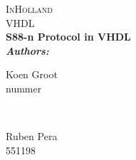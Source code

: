 \documentclass[12pt]{report}
\begin{document}
	\begin{titlepage}
		
		\pagecolor{landanimal}\afterpage{\nopagecolor}
		\center	
		
		\color{white}
		\textsc{\LARGE InHolland}\\[1.5cm] %
		\textsc{\Large VHDL}\\[2.5cm] %
		
		
		\huge \bfseries S88-n Protocol in VHDL \\[2.0cm] %
		
		\emph{Authors:}\\
		
		\begin{minipage}{0.4\textwidth}
			\begin{flushleft} \large
				
				Koen Groot \\ nummer
			\end{flushleft}
		\end{minipage}
		~
		\begin{minipage}{0.4\textwidth}
			\begin{flushright} \large
				\large Ruben Pera \\ 551198
			\end{flushright}
		\end{minipage}
	
	
		
	\end{titlepage}

	\tableofcontents
	\clearpage
	

	
	
	

	
	
		
\end{document}
